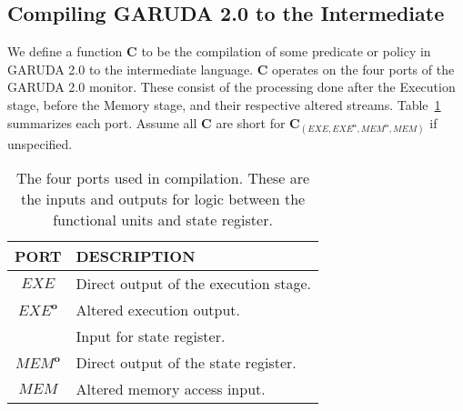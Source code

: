 \documentclass[12pt, letterpaper]{article}
\def \sysname {\textsc{GARUDA 2.0}\xspace}
\newcommand\obf[1]{#1^\mathbf{o}}
\begin{document}
    \subsection{Compiling \sysname to the Intermediate}\label{sec:compile:compile}
      We define a function $\mathbf{C}$ to be the compilation of some predicate or policy in \sysname to the intermediate language.
      $\mathbf{C}$ operates on the four ports of the \sysname monitor.
      These consist of the processing done after the Execution stage, before the Memory stage, and their respective altered streams.
      Table~\ref{tab:compile:compile:ports} summarizes each port.
      Assume all $\mathbf{C}$ are short for $\mathbf{C}_{(EXE,\obf{EXE},\obf{MEM},MEM)}$ if unspecified.
      \begin{table}
        \centering
        \begin{tabular}{c | l}
          PORT        & DESCRIPTION \\ \hline
          $EXE$       & Direct output of the execution stage. \\
          $\obf{EXE}$ & Altered execution output. \\
                      & Input for state register. \\
          $\obf{MEM}$ & Direct output of the state register. \\
          $MEM$       & Altered memory access input. 
        \end{tabular}
        \caption{
          The four ports used in compilation.
          These are the inputs and outputs for logic between the functional units and state register.
        }
        \label{tab:compile:compile:ports}
      \end{table}
\end{document}
